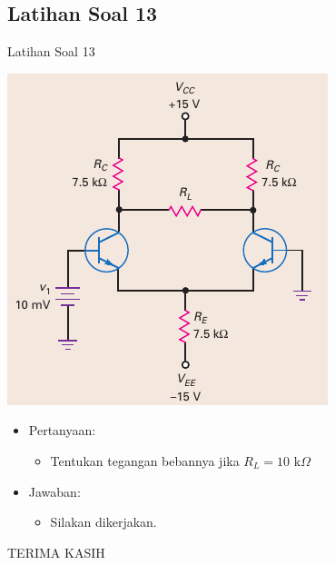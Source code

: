 \documentclass[aspectratio=169]{beamer}
\begin{document}
\subsection{Latihan Soal 13}
\begin{frame}{Latihan Soal 13}
	\begin{multicols}{2}
		\begin{center}
			\includegraphics[height=0.6\textheight]{gambar/01.fig32}
		\end{center}
		\columnbreak
		\begin{itemize}
			\item Pertanyaan:
			\begin{itemize}
				\item Tentukan tegangan bebannya jika $ R_L = 10 \text{ k}\Omega $
			\end{itemize}
			\item Jawaban:
			\begin{itemize}
				\item Silakan dikerjakan.
			\end{itemize}
		\end{itemize}
	\end{multicols}
\end{frame}

\begin{frame}
	\centering TERIMA KASIH
\end{frame}
\end{document}
